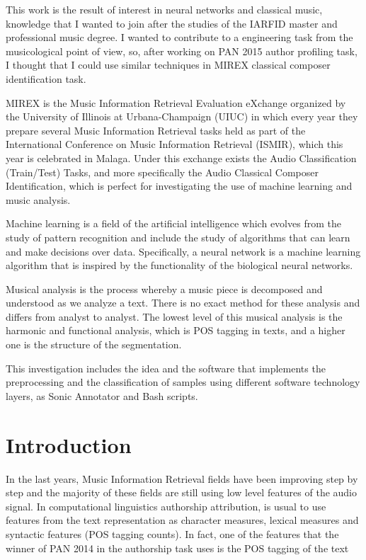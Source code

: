 \documentclass[a4paper,openany,oneside,12pt]{book}
\begin{document}
This work is the result of interest in neural networks and classical music, knowledge that I wanted to join after the studies of the IARFID master and professional music degree. I wanted to contribute to a engineering task from the musicological point of view, so, after working on PAN 2015 author profiling task, I thought that I could use similar techniques in MIREX classical composer identification task.

MIREX is the Music Information Retrieval Evaluation eXchange organized by the University of Illinois at Urbana-Champaign (UIUC) in which every year they prepare several Music Information Retrieval tasks held as part of the International Conference on Music Information Retrieval (ISMIR), which this year is celebrated in Malaga. Under this exchange exists the Audio Classification (Train/Test) Tasks, and more specifically the Audio Classical Composer Identification, which is perfect for investigating the use of machine learning and music analysis.

Machine learning is a field of the artificial intelligence which evolves from the study of pattern recognition and include the study of algorithms that can learn and make decisions over data. Specifically, a neural network is a machine learning algorithm that is inspired by the functionality of the biological neural networks.

Musical analysis is the process whereby a music piece is decomposed and understood as we analyze a text. There is no exact method for these analysis and differs from analyst to analyst. The lowest level of this musical analysis is the harmonic and functional analysis, which is POS tagging in texts, and a higher one is the structure of the segmentation.

This investigation includes the idea and the software that implements the preprocessing and the classification of samples using different software technology layers, as Sonic Annotator and Bash scripts.


\newpage


\tableofcontents %

\cleardoublepage
{} %
\listoffigures %





\chapter{Introduction}
In the last years, Music Information Retrieval fields have been improving step by step and the majority of these fields are still using low level features of the audio signal. In computational linguistics authorship attribution, is usual to use features from the text representation as character measures, lexical measures and syntactic features (POS tagging counts). In fact, one of the features that the winner of PAN 2014 in the authorship task uses is the POS tagging of the text \cite{pan14}
\end{document}
